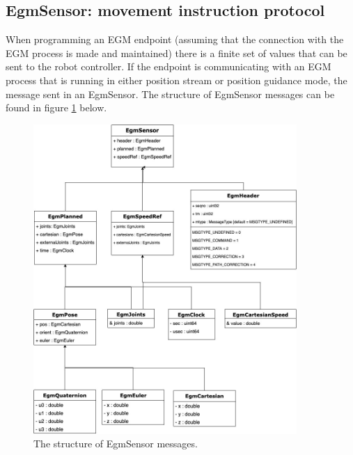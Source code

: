 \documentclass{cslthse-msc}
\begin{document}
\subsection{EgmSensor: movement instruction protocol}
\label{sec:EGM:Message_Protos:EgmSensor}
When programming an EGM endpoint (assuming that the connection with the EGM process is made and maintained) there is a finite set of values that can be sent to the robot controller. If the endpoint is communicating with an EGM process that is running in either position stream or position guidance mode, the message sent in an EgmSensor. The structure of EgmSensor messages can be found in figure \ref{fig:egm_sensor} below. \par 
\begin{figure}[H]
\vspace{0.30cm}
    \centering
    \includegraphics[width=10cm]{egm_sensor_proto_spelling.jpg}
    \caption{The structure of EgmSensor messages.}
    \label{fig:egm_sensor}
\end{figure}
\end{document}
